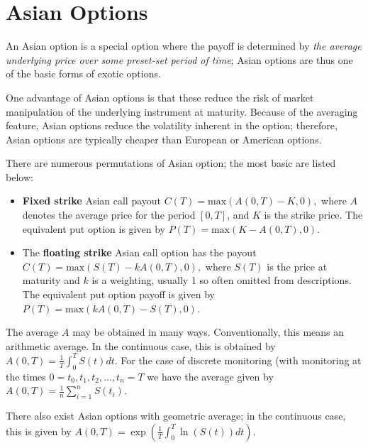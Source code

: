 \section{Asian Options}
\label{sec:asian_option}

An Asian option is a special option where the payoff is determined by \emph{the average underlying price over some preset-set period of time}; 
Asian options are thus one of the basic forms of exotic options. 

One advantage of Asian options is that these reduce the risk of market manipulation of the underlying instrument at maturity.
Because of the averaging feature, Asian options reduce the volatility inherent in the option; therefore, Asian options are typically cheaper than European or American options. 

There are numerous permutations of Asian option; the most basic are listed below:
\begin{itemize}
\item \textbf{Fixed strike} Asian call payout
$C(T)={\text{max}}\left(A(0,T)-K,0\right),$
where $A$ denotes the average price for the period $[0, T]$, and $K$ is the strike price. 
The equivalent put option is given by
$P(T)={\text{max}}\left(K-A(0,T),0\right)$.

\item The \textbf{floating strike} Asian call option has the payout
$C(T)={\text{max}}\left(S(T)-kA(0,T),0\right),$
where $S(T)$ is the price at maturity and $k$ is a weighting, usually 1 so often omitted from descriptions.
The equivalent put option payoff is given by
$P(T)={\text{max}}\left(kA(0,T)-S(T),0\right)$.
\end{itemize}

The average $A$ may be obtained in many ways. Conventionally, this means an arithmetic average. In the continuous case, this is obtained by
$A(0,T)={\frac  {1}{T}}\int _{{0}}^{{T}}S(t)dt$.
For the case of discrete monitoring (with monitoring at the times 
$0=t_{0},t_{1},t_{2},\dots ,t_{n}=T$ we have the average given by
${\displaystyle A(0,T)={\frac {1}{n}}\sum _{i=1}^{n}S(t_{i}).}$

There also exist Asian options with geometric average; in the continuous case, this is given by
$A(0,T)=\exp \left({\frac  {1}{T}}\int _{{0}}^{{T}}\ln(S(t))dt\right)$.

